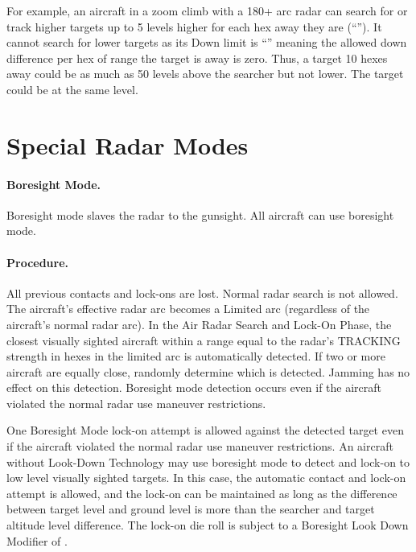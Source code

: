 {\begin{advancedrules}
For example, an aircraft in a zoom climb with a 180+ arc radar can search for or track higher targets up to 5 levels higher for each hex away they are (“”). It cannot search for lower targets as its Down limit is “” meaning the allowed down difference per hex of range the target is away is zero. Thus, a target 10 hexes away could be as much as 50 levels above the searcher but not lower. The target could be at the same level.

\section{Special Radar Modes}
\label{rule:special-radar-modes}

\paragraph{Boresight Mode.}\label{rule:boresight-mode} Boresight mode slaves the radar to the gunsight. All aircraft can use boresight mode.  

\paragraph{Procedure.}  All previous contacts and lock-ons are lost. Normal radar search is not allowed. The aircraft's effective radar arc becomes a Limited arc (regardless of the aircraft's normal radar arc). In the Air Radar Search and Lock-On Phase, the closest visually sighted aircraft within a range equal to the radar's TRACKING strength in hexes in the limited arc is automatically detected. If two or more aircraft are equally close, randomly determine which is detected. Jamming has no effect on this detection. Boresight mode detection occurs even if the aircraft violated the normal radar use maneuver restrictions.

One Boresight Mode lock-on attempt is allowed against the detected target even if the aircraft violated the normal radar use maneuver restrictions. An aircraft without Look-Down Technology may use boresight mode to detect and lock-on to low level visually sighted targets. In this case, the automatic contact and lock-on attempt is allowed, and the lock-on can be maintained as long as the difference between target level and ground level is more than the searcher and target altitude level difference. The lock-on die roll is subject to a Boresight Look Down Modifier of . 


\end{advancedrules}}
